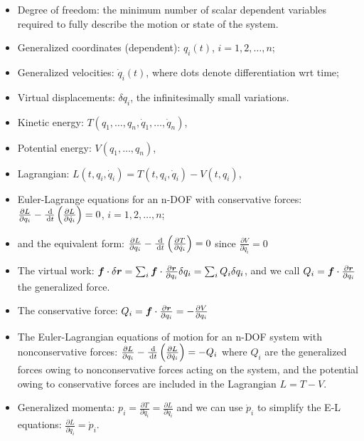 \documentclass{article}
\begin{document}
\begin{itemize}
    \item Degree of freedom: the minimum number of scalar dependent variables required to fully describe the motion or state of the system.
    \item Generalized coordinates (dependent): \(q_i(t)\), \(i=1,2,\dots, n\);
    \item Generalized velocities: \(\dot q_i(t)\), where dots denote differentiation wrt time;
    \item Virtual displacements: \(\delta q_i\), the infinitesimally small variations.
    \item Kinetic energy: \(T(q_1,\dots,q_n,\dot q_1,\dots,\dot q_n)\),
    \item Potential energy: \(V(q_1,\dots,q_n)\),
    \item Lagrangian: \(L (t,q_i,\dot q_i) = T(t,q_i,\dot q_i)-V(t,q_i) \),
    \item Euler-Lagrange equations for an n-DOF with conservative forces: \(\frac{\partial L}{\partial q_i}-\frac{\,\mathrm{d} }{\,\mathrm{d} t}\left( \frac{\partial L}{\partial \dot q_i} \right)=0\), \(i=1,2,\dots, n\);
    \item and the equivalent form: \(\frac{\partial L}{\partial q_i}-\frac{\,\mathrm{d} }{\,\mathrm{d} t}\left( \frac{\partial T}{\partial \dot q_i} \right)=0\) since \(\frac{\partial V}{\partial \dot q_i}=0\)
    \item The virtual work: \(\boldsymbol{f}\cdot \delta\boldsymbol{r} = \sum_i \boldsymbol{f}\cdot \frac{\partial \boldsymbol{r}}{\partial q_i}\delta q_i = \sum_i Q_i \delta q_i\), and we call \(Q_i=\boldsymbol{f}\cdot\frac{\partial \boldsymbol{r}}{\partial q_i} \) the generalized force.
    \item The conservative force: \(Q_i=\boldsymbol{f}\cdot\frac{\partial \boldsymbol{r}}{\partial q_i}=-\frac{\partial V}{\partial q_i}\)
    \item The Euler-Lagrangian equations of motion for an n-DOF system with nonconservative forces: \(\frac{\partial L}{\partial q_i}-\frac{\,\mathrm{d} }{\,\mathrm{d} t}\left( \frac{\partial L}{\partial \dot q_i} \right)=-Q_i\) where \(Q_i\) are the generalized forces owing to nonconservative forces acting on the system, and the potential owing to conservative forces are included in the Lagrangian \(L=T-V\).
    \item Generalized momenta: \(p_i = \frac{\partial T}{\partial \dot q_i} = \frac{\partial L}{\partial \dot q_i}\) and we can use \(\dot p_i\) to simplify the E-L equations: \(\frac{\partial L}{\partial q_i}=\dot p_i\).
\end{itemize}
\end{document}
